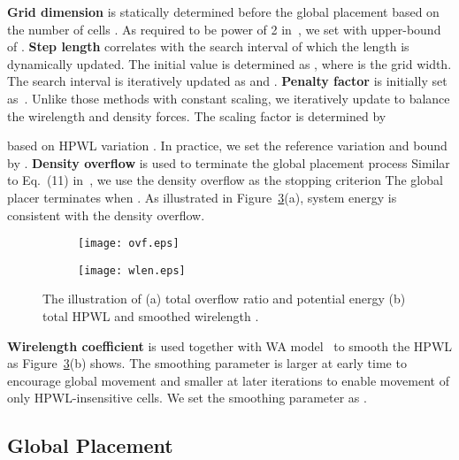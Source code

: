 \documentclass[conference,10pt]{IEEEtran}
\begin{document}
{\bf Grid dimension}  is statically determined 
before the global placement based on the number of cells 
.
As required to be power of 2 in~\cite{fft}, 
we set  with upper-bound of .
{\bf Step length} correlates with the search interval of which the 
length is dynamically updated.
The initial value is determined as 
, where  is the grid width.
The search interval is iteratively updated as 
 and 
.
{\bf Penalty factor} is 
initially set as~\cite{ntupl3,aplace2}. 
Unlike those methods with 
constant scaling, 
we iteratively update  
to balance the wirelength and density forces.
The scaling factor is determined by 

based on HPWL variation 
. 
In practice, we set the reference variation 
 and bound  by .
{\bf Density overflow} is used to terminate the 
global placement process 
Similar to Eq.~(11) in~\cite{ntupl3},
we use the density overflow  as the stopping criterion 
The global placer terminates when .
As illustrated in Figure~\ref{fig:ovf}(a), 
system energy is consistent with the density overflow.
\begin{figure}\centering
  \begin{subfigure}[b]{0.25\textwidth}
    \centering
    \texttt{[image: ovf.eps]}
    \caption{}
    \label{subfig:ovf}
  \end{subfigure}\begin{subfigure}[b]{0.25\textwidth}
    \centering
    \texttt{[image: wlen.eps]}
    \caption{}
    \label{subfig:wlen}
  \end{subfigure}
  \caption{The illustration of (a) total overflow ratio  and potential energy  (b) total HPWL  and smoothed wirelength .}
\label{fig:ovf}
\end{figure}
{\bf Wirelength coefficient} is used together with WA model~\cite{wa} 
to smooth the HPWL as Figure~\ref{fig:ovf}(b) shows. 
The smoothing parameter  is larger at early time
to encourage global movement 
and smaller at later iterations to enable movement of 
only HPWL-insensitive cells.
We set the smoothing parameter as  
.



\subsection{Global Placement}
\label{subsec:gp_flow}
\end{document}
